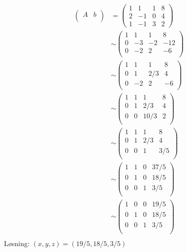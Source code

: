   \begin{align*}
    \begin{pmatrix}
      A &b \\
    \end{pmatrix}
    &= 
      \begin{pmatrix}
        1 & 1 & 1 & 8\\
        2 & -1 & 0 &4 \\
        1 & -1 & 3 &2
      \end{pmatrix}\\
        &\sim
          \begin{pmatrix}
        1 & 1 & 1 & 8\\
        0 & -3 & -2 &-12 \\
        0 & -2 & 2 &-6\\
          \end{pmatrix}\\
        &\sim
  \begin{pmatrix}
    1 & 1 & 1 & 8\\
    0 & 1 & 2/3 &4 \\
        0 & -2 & 2 &-6\\
  \end{pmatrix}\\
        &\sim
  \begin{pmatrix}
    1 & 1 & 1 & 8\\
    0 & 1 & 2/3 &4 \\
    0 & 0 & 10/3 &2\\
  \end{pmatrix}\\
    &\sim
  \begin{pmatrix}
    1 & 1 & 1 & 8\\
    0 & 1 & 2/3 &4 \\
    0 & 0 & 1 &3/5\\
  \end{pmatrix}\\
    &\sim
  \begin{pmatrix}
    1 & 1 & 0 & 37/5\\
    0 & 1 & 0 & 18/5 \\
    0 & 0 & 1 & 3/5\\
  \end{pmatrix}\\
    &\sim
  \begin{pmatrix}
    1 & 0 & 0 & 19/5\\
    0 & 1 & 0 & 18/5 \\
    0 & 0 & 1 & 3/5\\
  \end{pmatrix}\\
  \end{align*}
  Løsning: $(x,y,z) = (19/5, 18/5, 3/5)$




